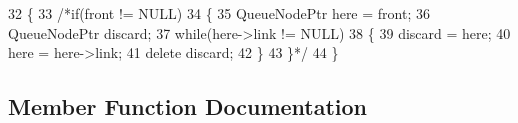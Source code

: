 \begin{DoxyCode}
32    \{
33       \textcolor{comment}{/*if(front != NULL)                                                                                  
                                                                                                       }
34 \textcolor{comment}{      \{                                                                                                    
                                                                                                       }
35 \textcolor{comment}{         QueueNodePtr here = front;                                                                        
                                                                                                       }
36 \textcolor{comment}{         QueueNodePtr discard;                                                                             
                                                                                                       }
37 \textcolor{comment}{         while(here->link != NULL)                                                                         
                                                                                                       }
38 \textcolor{comment}{         \{                                                                                                 
                                                                                                       }
39 \textcolor{comment}{            discard = here;                                                                                
                                                                                                       }
40 \textcolor{comment}{            here = here->link;                                                                             
                                                                                                       }
41 \textcolor{comment}{            delete discard;                                                                                
                                                                                                       }
42 \textcolor{comment}{         \}                                                                                                 
                                                                                                       }
43 \textcolor{comment}{         \}*/}
44    \}
\end{DoxyCode}


\subsection{Member Function Documentation}
